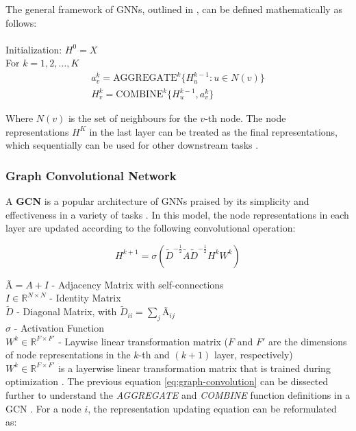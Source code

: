 \documentclass[11pt,a4paper]{article}
\begin{document}
The general framework of \acp{GNN}, outlined in \cite{tangGraphNeuralNetworks2022}, can be defined mathematically as follows: \\ \\
Initialization: $H^0 = X$ \\
For $k = 1, 2, \dots, K$
\begin{gather*}
 a^k_v = \text{AGGREGATE}^k\{H^{k-1}_u : u \in N(v)\} \\
 H^k_v = \text{COMBINE}^k\{H^{k-1}_u, a^k_v\}       
\end{gather*}

Where $N(v)$ is the set of neighbours for the $v$-th node. The node representations $H^K$ in the last layer can be treated as the final representations, which sequentially can be used for other downstream tasks \cite{tangGraphNeuralNetworks2022}.


\subsubsection{Graph Convolutional Network}

A \textbf{\ac{GCN}} \cite{kipfSemiSupervisedClassificationGraph2017} is a popular architecture of \acp{GNN} praised by its simplicity and effectiveness in a variety of tasks \cite{liuIntroductionGraphNeural2020, tangGraphNeuralNetworks2022}. In this model, the node representations in each layer are updated according to the following convolutional operation:

\begin{equation} \label{eq:graph-convolution}
  H^{k+1} = \sigma(\tilde{D}^{-\frac{1}{2}} \tilde{A} \tilde{D}^{-\frac{1}{2}} H^k W^k)  
\end{equation}

$Ã = A + I$ - Adjacency Matrix with self-connections \\
$I \in \mathbb{R}^{N \times N}$ - Identity Matrix \\
$\tilde{D}$ - Diagonal Matrix,  with $\tilde{D}_{ii} = \sum_j Ã_{ij}$ \\
$\sigma$ - Activation Function \\
$W^k \in \mathbb{R}^{F \times F'}$ - Laywise linear transformation matrix ($F$ and $F'$ are the dimensions of node representations in the $k$-th and $(k + 1)$ layer, respectively) \\
 
$W^k \in \mathbb{R}^{F \times F'}$ is a layerwise linear transformation matrix that is trained during optimization \cite{tangGraphNeuralNetworks2022}. The previous equation \ref{eq:graph-convolution} can be dissected further to understand the \textit{AGGREGATE} and \textit{COMBINE} function definitions in a \ac{GCN} \cite{tangGraphNeuralNetworks2022}. For a node $i$, the representation updating equation can be reformulated as:
\end{document}
